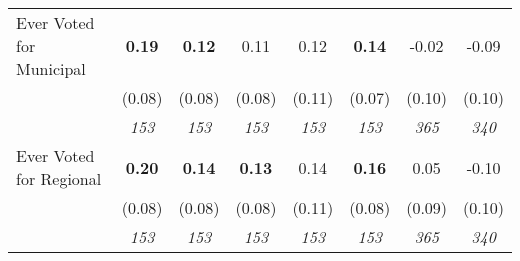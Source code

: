\begin{tabular}{l c c c c c c c}
Ever Voted for Municipal & \textbf{ 0.19 } & \textbf{ 0.12 } & 0.11 & 0.12 & \textbf{0.14} & -0.02 & -0.09 \\
& (0.08) & (0.08) & (0.08) & (0.11) & (0.07) & (0.10) & (0.10) \\
& \textit{ 153 } & \textit{ 153 } & \textit{ 153 } & \textit{ 153 } & \textit{ 153 } & \textit{ 365 } & \textit{ 340 } \\
Ever Voted for Regional & \textbf{ 0.20 } & \textbf{ 0.14 } & \textbf{ 0.13 } & 0.14 & \textbf{0.16} & 0.05 & -0.10 \\
& (0.08) & (0.08) & (0.08) & (0.11) & (0.08) & (0.09) & (0.10) \\
& \textit{ 153 } & \textit{ 153 } & \textit{ 153 } & \textit{ 153 } & \textit{ 153 } & \textit{ 365 } & \textit{ 340 } \\
\bottomrule
\end{tabular}
